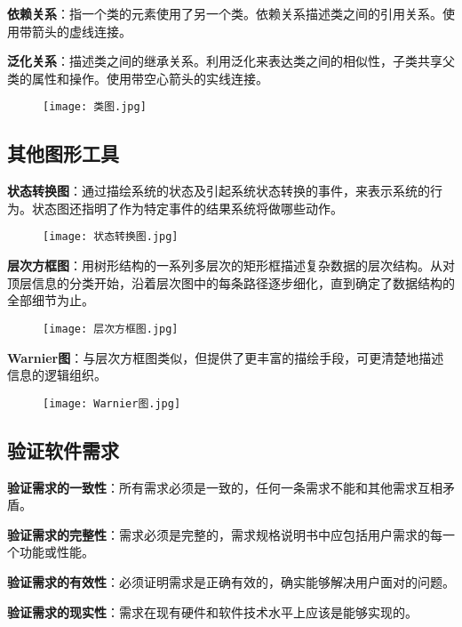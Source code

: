 \documentclass[cn, blue, normal, 12pt]{elegantnote}
\begin{document}
\textbf{依赖关系}：指一个类的元素使用了另一个类。依赖关系描述类之间的引用关系。使用带箭头的虚线连接。

\textbf{泛化关系}：描述类之间的继承关系。利用泛化来表达类之间的相似性，子类共享父类的属性和操作。使用带空心箭头的实线连接。

\begin{figure}[htbp]
    \centering
    \texttt{[image: 类图.jpg]}
\end{figure}

\subsection{其他图形工具}

\textbf{状态转换图}：通过描绘系统的状态及引起系统状态转换的事件，来表示系统的行为。状态图还指明了作为特定事件的结果系统将做哪些动作。

\begin{figure}[htbp]
    \centering
    \texttt{[image: 状态转换图.jpg]}
\end{figure}

\textbf{层次方框图}：用树形结构的一系列多层次的矩形框描述复杂数据的层次结构。从对顶层信息的分类开始，沿着层次图中的每条路径逐步细化，直到确定了数据结构的全部细节为止。

\begin{figure}[htbp]
    \centering
    \texttt{[image: 层次方框图.jpg]}
\end{figure}

\textbf{Warnier图}：与层次方框图类似，但提供了更丰富的描绘手段，可更清楚地描述信息的逻辑组织。

\begin{figure}[htbp]
    \centering
    \texttt{[image: Warnier图.jpg]}
\end{figure}

\subsection{验证软件需求}

\textbf{验证需求的一致性}：所有需求必须是一致的，任何一条需求不能和其他需求互相矛盾。

\textbf{验证需求的完整性}：需求必须是完整的，需求规格说明书中应包括用户需求的每一个功能或性能。

\textbf{验证需求的有效性}：必须证明需求是正确有效的，确实能够解决用户面对的问题。

\textbf{验证需求的现实性}：需求在现有硬件和软件技术水平上应该是能够实现的。
\end{document}
